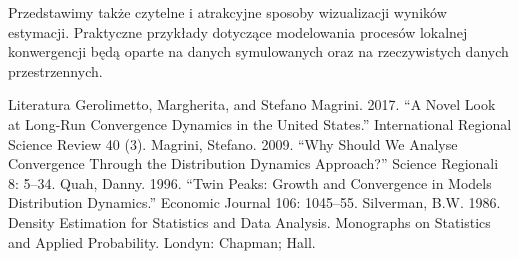 \documentclass[\main/boa.tex]{subfiles}
\begin{document}
  Przedstawimy także czytelne i atrakcyjne sposoby wizualizacji wyników estymacji. Praktyczne przykłady dotyczące modelowania procesów lokalnej konwergencji będą oparte na danych symulowanych oraz na rzeczywistych danych przestrzennych.
  
  Literatura Gerolimetto, Margherita, and Stefano Magrini. 2017. “A Novel Look at Long-Run Convergence Dynamics in the United States.” International Regional Science Review 40 (3). Magrini, Stefano. 2009. “Why Should We Analyse Convergence Through the Distribution Dynamics Approach?” Science Regionali 8: 5–34. Quah, Danny. 1996. “Twin Peaks: Growth and Convergence in Models Distribution Dynamics.” Economic Journal 106: 1045–55. Silverman, B.W. 1986. Density Estimation for Statistics and Data Analysis. Monographs on Statistics and Applied Probability. Londyn: Chapman; Hall.
\end{document}
